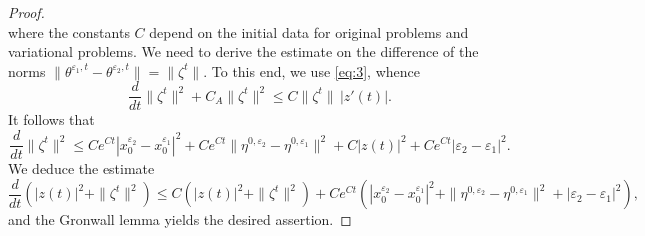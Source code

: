 \documentclass[11pt, leqno]{amsart}
\newtheorem{lem}[thm]{Lemma}
\theoremstyle{definition}
\begin{document}
\begin{proof}
$$$$
where the constants $C$ depend on the initial data for original problems and variational problems.
		We need to derive the estimate on the difference of the norms  $\|\theta^{\varepsilon_1,t}-\theta^{\varepsilon_2,t}\| = \|\zeta^t\|$. To this end, we use  \eqref{eq:3}, whence
		$$
		\frac{d}{dt}\|\zeta^t\|^2+C_A\|\zeta^t\|^2\leq C\|\zeta^t\|\, |z'(t)|.
		$$
		It follows that
		$$
		\frac{d}{dt}\|\zeta^t\|^2\leq Ce^{Ct}|x^{\varepsilon_2}_0-x^{\varepsilon_1}_0|^2+Ce^{Ct}\|\eta^{0,\varepsilon_2}-\eta^{0,\varepsilon_1}\|^2+ C|z(t)|^2+Ce^{Ct}|\varepsilon_2-\varepsilon_1|^2.
		$$
		We deduce the estimate
			$$
		\frac{d}{dt}(|z(t)|^2+\|\zeta^t\|^2) \leq C(|z(t)|^2+\|\zeta^t\|^2) + Ce^{Ct}(|x^{\varepsilon_2}_0-x^{\varepsilon_1}_0|^2+\|\eta^{0,\varepsilon_2}-\eta^{0,\varepsilon_1}\|^2+ |\varepsilon_2-\varepsilon_1|^2),
		$$
		and the Gronwall lemma yields the desired assertion.
		\end{proof}
		
\end{document}
